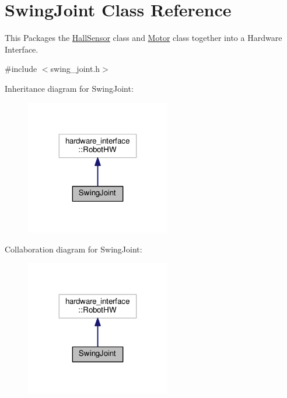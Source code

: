 \hypertarget{classSwingJoint}{}\section{Swing\+Joint Class Reference}
\label{classSwingJoint}


This Packages the \hyperlink{classHallSensor}{Hall\+Sensor} class and \hyperlink{classMotor}{Motor} class together into a Hardware Interface.  




{\ttfamily \#include $<$swing\+\_\+joint.\+h$>$}



Inheritance diagram for Swing\+Joint\+:\nopagebreak
\begin{figure}[H]
\begin{center}
\leavevmode
\includegraphics[width=179pt]{classSwingJoint__inherit__graph}
\end{center}
\end{figure}


Collaboration diagram for Swing\+Joint\+:\nopagebreak
\begin{figure}[H]
\begin{center}
\leavevmode
\includegraphics[width=179pt]{classSwingJoint__coll__graph}
\end{center}
\end{figure}
